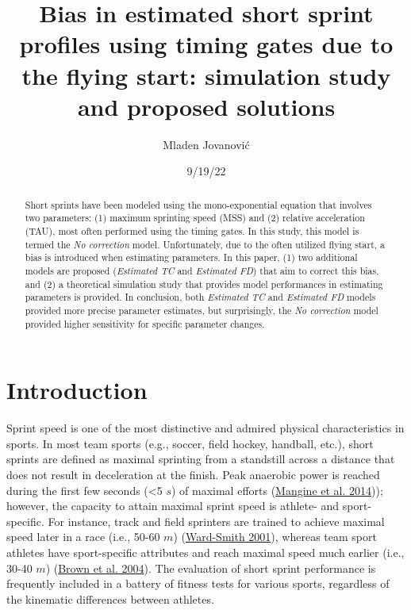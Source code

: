 \documentclass[
  letterpaper,
  DIV=11,
  numbers=noendperiod]{scrartcl}
\title{Bias in estimated short sprint profiles using timing gates due to
the flying start: simulation study and proposed solutions}
\author{Mladen Jovanović}
\date{9/19/22}
\renewcommand*\contentsname{Table of contents}
\newcommand\contentsname{Table of contents}
\begin{document}
\maketitle
\begin{abstract}
Short sprints have been modeled using the mono-exponential equation that
involves two parameters: (1) maximum sprinting speed (MSS) and (2)
relative acceleration (TAU), most often performed using the timing
gates. In this study, this model is termed the \emph{No correction}
model. Unfortunately, due to the often utilized flying start, a bias is
introduced when estimating parameters. In this paper, (1) two additional
models are proposed (\emph{Estimated TC} and \emph{Estimated FD}) that
aim to correct this bias, and (2) a theoretical simulation study that
provides model performances in estimating parameters is provided. In
conclusion, both \emph{Estimated TC} and \emph{Estimated FD} models
provided more precise parameter estimates, but surprisingly, the
\emph{No correction} model provided higher sensitivity for specific
parameter changes.
\end{abstract}
\ifdefined\Shaded\renewenvironment{Shaded}{\begin{tcolorbox}[enhanced, boxrule=0pt, frame hidden, sharp corners, borderline west={3pt}{0pt}{shadecolor}, breakable, interior hidden]}{\end{tcolorbox}}\fi

\renewcommand*\contentsname{Table of contents}
{
\hypersetup{linkcolor=}
\setcounter{tocdepth}{3}
\tableofcontents
}
\hypertarget{introduction}{%
\section{Introduction}\label{introduction}}

Sprint speed is one of the most distinctive and admired physical
characteristics in sports. In most team sports (e.g., soccer, field
hockey, handball, etc.), short sprints are defined as maximal sprinting
from a standstill across a distance that does not result in deceleration
at the finish. Peak anaerobic power is reached during the first few
seconds (\textless5 \(s\)) of maximal efforts
(\protect\hyperlink{ref-mangineSpeedForcePower2014}{Mangine et al.
2014})); however, the capacity to attain maximal sprint speed is
athlete- and sport-specific. For instance, track and field sprinters are
trained to achieve maximal speed later in a race (i.e., 50-60 \(m\))
(\protect\hyperlink{ref-ward-smithEnergyConversionStrategies2001}{Ward-Smith
2001}), whereas team sport athletes have sport-specific attributes and
reach maximal speed much earlier (i.e., 30-40 \(m\))
(\protect\hyperlink{ref-brownAssessmentLinearSprinting2004}{Brown et al.
2004}). The evaluation of short sprint performance is frequently
included in a battery of fitness tests for various sports, regardless of
the kinematic differences between athletes.
\end{document}
